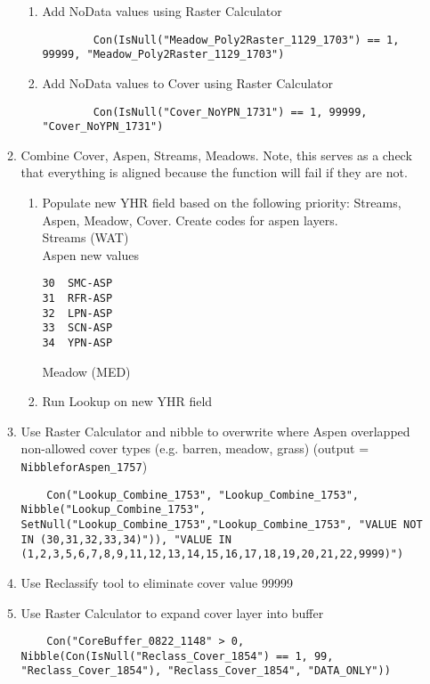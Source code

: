 \begin{enumerate}
\begin{enumerate}
\begin{enumerate}
        \item Add NoData values using Raster Calculator \begin{lstlisting}
        Con(IsNull("Meadow_Poly2Raster_1129_1703") == 1, 99999, "Meadow_Poly2Raster_1129_1703") \end{lstlisting}
        \item Add NoData values to Cover using Raster Calculator \begin{lstlisting}
        Con(IsNull("Cover_NoYPN_1731") == 1, 99999, "Cover_NoYPN_1731") \end{lstlisting}
        \end{enumerate}
    \item Combine Cover, Aspen, Streams, Meadows. Note, this serves as a check that everything is aligned because the function will fail if they are not.
        \begin{enumerate}
        \item Populate new YHR field based on the following priority: Streams, Aspen, Meadow, Cover. Create codes for aspen layers.\\
        Streams  (WAT)\\
        Aspen \textrightarrow new values
        \begin{verbatim}
30  SMC-ASP
31  RFR-ASP
32  LPN-ASP
33  SCN-ASP
34  YPN-ASP
\end{verbatim}
    Meadow  (MED)
        \item Run Lookup on new YHR field
        \end{enumerate}
    \item Use Raster Calculator and nibble to overwrite where Aspen overlapped non-allowed cover types (e.g. barren, meadow, grass) (output = \lstinline{NibbleforAspen_1757})
    \begin{lstlisting}
    Con("Lookup_Combine_1753", "Lookup_Combine_1753", Nibble("Lookup_Combine_1753", SetNull("Lookup_Combine_1753","Lookup_Combine_1753", "VALUE NOT IN (30,31,32,33,34)")), "VALUE IN (1,2,3,5,6,7,8,9,11,12,13,14,15,16,17,18,19,20,21,22,9999)") 
    \end{lstlisting}
    \item Use Reclassify tool to eliminate cover value 99999
    \item Use Raster Calculator to expand cover layer into buffer \begin{lstlisting}
    Con("CoreBuffer_0822_1148" > 0, Nibble(Con(IsNull("Reclass_Cover_1854") == 1, 99, "Reclass_Cover_1854"), "Reclass_Cover_1854", "DATA_ONLY")) \end{lstlisting}

\end{enumerate}
\end{enumerate}
